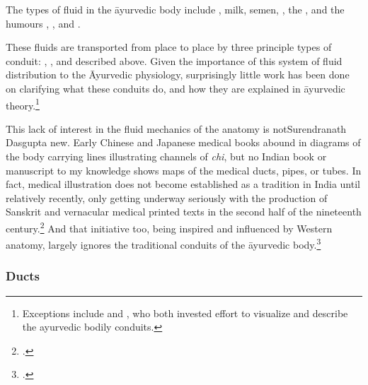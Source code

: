 \begin{refsection}
The types of fluid in the āyurvedic body include ,
milk, semen, , the , and the humours , , and
.



These fluids are transported from place to place by three principle
types of conduit: , , and
 described above. Given the importance of this
system of fluid distribution to the Āyurvedic physiology, surprisingly
little work has been done on clarifying what these conduits do, and
how they are explained in āyurvedic theory.\footnote{Exceptions
    include \citet[ii.13]{dasg-hist} and \citet[ch.\,2]{kutu-1962}, who
    both invested effort to visualize and describe the ayurvedic bodily
    conduits.}

This lack of interest in the fluid mechanics of the anatomy is notSurendranath 
Dasgupta
new.  Early Chinese and Japanese medical books abound in diagrams of
the body carrying lines illustrating channels of \emph{chi}, but no
Indian book or manuscript to my knowledge shows maps of the medical
ducts, pipes, or tubes.  In fact, medical illustration does not become
established as a tradition in India until relatively recently, only
getting underway seriously with the production of Sanskrit and
vernacular medical printed texts in the second half of the nineteenth
century.\footcite{wuja-2008a}  And that initiative too, being inspired
and influenced by Western anatomy, largely ignores the traditional
conduits of the āyurvedic body.\footnote{\cite{birc-2024,lust-2018}.}

\subsubsection{Ducts}


\end{refsection}
